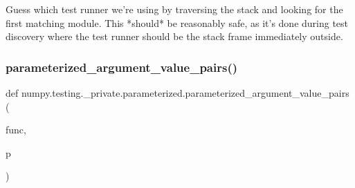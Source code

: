 \begin{DoxyVerb}Guess which test runner we're using by traversing the stack and looking
    for the first matching module. This *should* be reasonably safe, as
    it's done during test discovery where the test runner should be the
    stack frame immediately outside. \end{DoxyVerb}
 \mbox{\label{namespacenumpy_1_1testing_1_1__private_1_1parameterized_a619df385c6fd897bb599e20503b8bf0a}} 
\subsubsection{\texorpdfstring{parameterized\+\_\+argument\+\_\+value\+\_\+pairs()}{parameterized\_argument\_value\_pairs()}}
{\footnotesize\ttfamily def numpy.\+testing.\+\_\+private.\+parameterized.\+parameterized\+\_\+argument\+\_\+value\+\_\+pairs (\begin{DoxyParamCaption}\item[{}]{func,  }\item[{}]{p }\end{DoxyParamCaption})}

